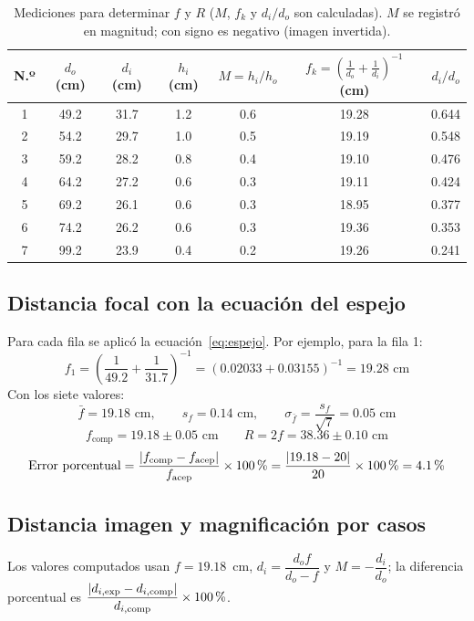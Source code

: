 \documentclass[11pt,a4paper]{article}
\begin{document}
\begin{table}[H]
\centering
\begin{tabular}{ccccccc}
\toprule
\textbf{N.º} & $d_o$ (cm) & $d_i$ (cm) & $h_i$ (cm) & $M = h_i/h_o$ & $f_k = \left(\frac{1}{d_o}+\frac{1}{d_i}\right)^{-1}$ (cm) & $d_i/d_o$ \\
\midrule
1 & 49.2 & 31.7 & 1.2 & 0.6 & 19.28 & 0.644 \\
2 & 54.2 & 29.7 & 1.0 & 0.5 & 19.19 & 0.548 \\
3 & 59.2 & 28.2 & 0.8 & 0.4 & 19.10 & 0.476 \\
4 & 64.2 & 27.2 & 0.6 & 0.3 & 19.11 & 0.424 \\
5 & 69.2 & 26.1 & 0.6 & 0.3 & 18.95 & 0.377 \\
6 & 74.2 & 26.2 & 0.6 & 0.3 & 19.36 & 0.353 \\
7 & 99.2 & 23.9 & 0.4 & 0.2 & 19.26 & 0.241 \\
\bottomrule
\end{tabular}
\caption{Mediciones para determinar $f$ y $R$ ($M$, $f_k$ y $d_i/d_o$ son calculadas). $M$ se registró en magnitud; con signo es negativo (imagen invertida).}
\label{tab:datos}
\end{table}

\subsection{Distancia focal con la ecuación del espejo}

Para cada fila se aplicó la ecuación~\eqref{eq:espejo}. Por ejemplo, para la fila 1:
\[
  f_1 = \left(\frac{1}{49.2} + \frac{1}{31.7}\right)^{-1} = \left(0.02033 + 0.03155\right)^{-1} = 19.28 \text{ cm}
\]
Con los siete valores:
\[
  \bar f = 19.18 \text{ cm}, \qquad s_f = 0.14 \text{ cm}, \qquad \sigma_{\bar f} = \frac{s_f}{\sqrt{7}} = 0.05 \text{ cm}
\]
\[
  \boxed{f_{\text{comp}} = 19.18 \pm 0.05 \text{ cm}} \qquad R = 2f = 38.36 \pm 0.10 \text{ cm}
\]
\[
  \text{Error porcentual} = \frac{|f_{\text{comp}} - f_{\text{acep}}|}{f_{\text{acep}}}\times 100\text{\,\%} = \frac{|19.18 - 20|}{20}\times 100\text{\,\%} = 4.1\text{\,\%}
\]

\subsection{Distancia imagen y magnificación por casos}

Los valores computados usan $f = 19.18$~cm, $d_i = \dfrac{d_o f}{d_o - f}$ y $M = -\dfrac{d_i}{d_o}$; la diferencia porcentual es $\dfrac{|d_{i,\text{exp}} - d_{i,\text{comp}}|}{d_{i,\text{comp}}}\times 100\text{\,\%}$.
\end{document}
